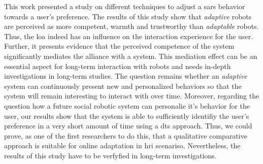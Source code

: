 \documentclass[twocolumn]{svjour3}          %
\begin{document}
This work presented a study on different techniques to adjust a \glspl{sar}
behavior towards a user's preference. The results of this study show
that \textit{adaptive} robots are perceived as more competent, warmth and
trustworthy than \textit{adaptable} robots. Thus, the \gls{loa} indeed  has an influence on the interaction experience for the user. Further, it presents evidence that
the perceived competence of the system significantly mediates the
alliance with a system. This mediation effect can be an essential aspect
for long-term interaction with robots and needs in-depth investigations
in long-term studies. The question remains whether an \textit{adaptive} system
can continuously present new and personalized behaviors so that the
system will remain interesting to interact with over time. Moreover, regarding the question how a future social robotic system can personalie it's behavior for the user, our results show that the system is able to sufficiently identifiy the user's preference in a very short amount of time using a \gls{dts} approach. Thus, we could prove, as one of the first researchers to do this, that a qualitative comparative approach is suitable for online adaptation in \gls{hri} scenariso. Nevertheless, the results of this study have to be verfyfied in long-term investigations.

\printglossary

\printbibliography{}

% 
% 
\end{document}
